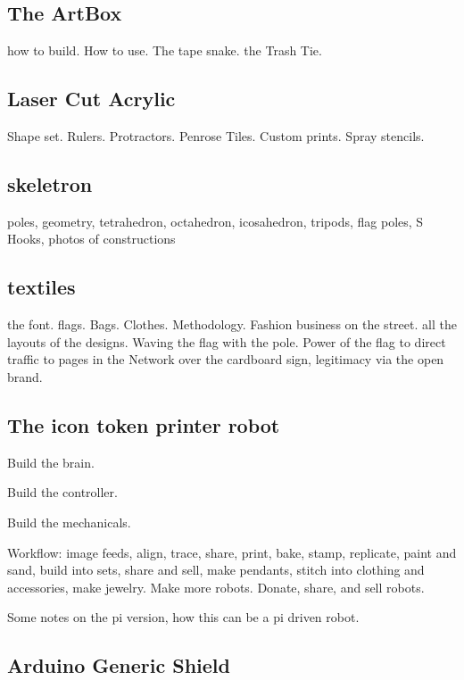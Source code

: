 \subsection{The ArtBox}

how to build.  How to use.  The tape snake. the Trash Tie.

\subsection{Laser Cut Acrylic}

Shape set. Rulers. Protractors. Penrose Tiles. Custom prints. Spray stencils.  

\subsection{skeletron}

poles, geometry, tetrahedron, octahedron, icosahedron, tripods, flag poles, S Hooks, photos of constructions

\subsection{textiles}

the font. flags. Bags. Clothes.  Methodology. Fashion business on the street. all the layouts of the designs.  Waving the flag with the pole. Power of the flag to direct traffic to pages in the Network over the cardboard sign, legitimacy via the open brand.

\subsection{The icon token printer robot}

Build the brain. 

Build the controller. 

Build the mechanicals.  

Workflow:  image feeds, align, trace, share, print, bake, stamp, replicate, paint and sand, build into sets, share and sell, make pendants, stitch into clothing and accessories, make jewelry. Make more robots. Donate, share, and sell robots. 

Some notes on the pi version, how this can be a pi driven robot.

\subsection{Arduino Generic Shield}

